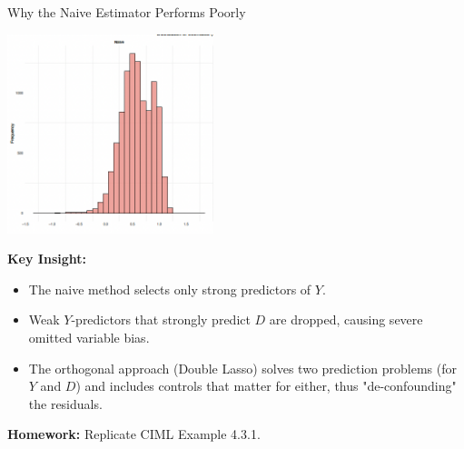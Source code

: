 \documentclass[xcolor=svgnames,t]{beamer}
\begin{document}
            
            \begin{frame}{Why the Naive Estimator Performs Poorly }
            \begin{center}
            \includegraphics[width=0.45\textwidth]{Figures/naive.png}
            \end{center}
            
            \pause
            \scriptsize
            \textbf{Key Insight:}
            \begin{itemize}
                \item The naive method selects only strong predictors of $Y$.
                \pause
                \item Weak $Y$-predictors that strongly predict $D$ are dropped, causing severe omitted variable bias.
                \pause
                \item The orthogonal approach (Double Lasso) solves two prediction problems (for $Y$ and $D$) and includes controls that matter for either, thus "de-confounding" the residuals.
            \end{itemize}
            
            \pause
            \textbf{Homework:} Replicate CIML Example 4.3.1.
            \end{frame}
            
\end{document}
